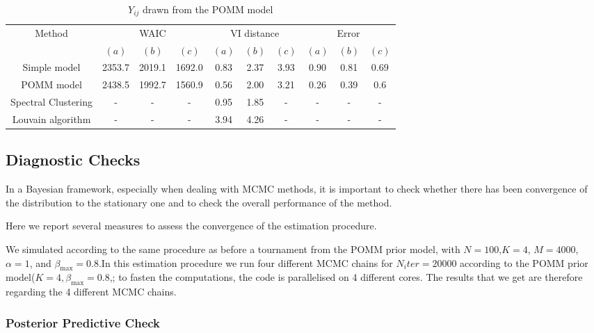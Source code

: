 \documentclass[11pt]{amsart}
\begin{document}
\begin{table}[htbp]
\centering
\caption{$Y_{ij}$ drawn from the POMM model}
\begin{tabular}{cccccccccc}
\toprule
\multirow{2}{*}{Method} & \multicolumn{3}{c}{WAIC} & \multicolumn{3}{c}{VI distance} & \multicolumn{3}{c}{Error} \\
\cmidrule(lr){2-4} \cmidrule(lr){5-7} \cmidrule(lr){8-10}
& $(a)$ & $(b)$ & $(c)$ & $(a)$ & $(b)$ & $(c)$ & $(a)$ & $(b)$ & $(c)$ \\
\midrule
Simple model & 2353.7 & 2019.1 & 1692.0 & 0.83 & 2.37 & 3.93 & 0.90 & 0.81& 0.69  \\
POMM model & 2438.5 & 1992.7 & 1560.9 & 0.56 & 2.00 & 3.21 & 0.26 & 0.39 & 0.6 \\
Spectral Clustering & - & - & - & 0.95 & 1.85 & - & - & - & - \\
Louvain algorithm & - & - & - & 3.94 & 4.26 & - & - & - & - \\
\bottomrule
\end{tabular}
\end{table}

\clearpage
\subsection{Diagnostic Checks}

In a Bayesian framework, especially when dealing with MCMC methods, it is important to check whether there has been convergence of the distribution to the stationary one and to check the overall performance of the method.

Here we report several measures to assess the convergence of the estimation procedure.

We simulated according to the same procedure as before a tournament from the POMM prior model, with $N=100$,$K=4$, $M=4000$, $\alpha=1$, and $\beta_{\max}=0.8$.In this estimation procedure we run four different MCMC chains for $N_iter = 20000$ according to the POMM prior model($K=4,\beta_{\max}=0.8$,; to fasten the computations, the code is parallelised on 4 different cores. The results that we get are therefore regarding the 4 different MCMC chains.


\subsubsection{Posterior Predictive Check}
\end{document}
